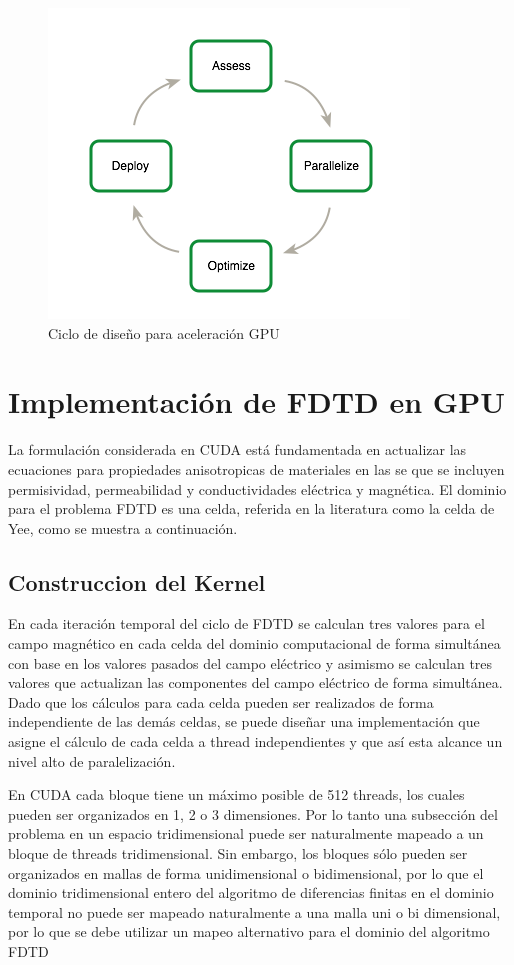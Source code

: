 \documentclass[]{article}
\begin{document}
\begin{figure}
\centering
\includegraphics{img/best_cuda.png}
\caption{Ciclo de diseño para aceleración GPU}
\end{figure}

\section{Implementación de FDTD en
GPU}\label{implementacion-de-fdtd-en-gpu}

La formulación considerada en CUDA está fundamentada en actualizar las
ecuaciones para propiedades anisotropicas de materiales en las se que se
incluyen permisividad, permeabilidad y conductividades eléctrica y
magnética. El dominio para el problema FDTD es una celda, referida en la
literatura como la celda de Yee, como se muestra a continuación.

\subsection{Construccion del Kernel}\label{construccion-del-kernel}

En cada iteración temporal del ciclo de FDTD se calculan tres valores
para el campo magnético en cada celda del dominio computacional de forma
simultánea con base en los valores pasados del campo eléctrico y
asimismo se calculan tres valores que actualizan las componentes del
campo eléctrico de forma simultánea. Dado que los cálculos para cada
celda pueden ser realizados de forma independiente de las demás celdas,
se puede diseñar una implementación que asigne el cálculo de cada celda
a thread independientes y que así esta alcance un nivel alto de
paralelización.

En CUDA cada bloque tiene un máximo posible de 512 threads, los cuales
pueden ser organizados en 1, 2 o 3 dimensiones. Por lo tanto una
subsección del problema en un espacio tridimensional puede ser
naturalmente mapeado a un bloque de threads tridimensional. Sin embargo,
los bloques sólo pueden ser organizados en mallas de forma
unidimensional o bidimensional, por lo que el dominio tridimensional
entero del algoritmo de diferencias finitas en el dominio temporal no
puede ser mapeado naturalmente a una malla uni o bi dimensional, por lo
que se debe utilizar un mapeo alternativo para el dominio del algoritmo
FDTD
\end{document}
